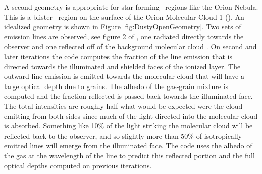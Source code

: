 A second geometry is appropriate for star-forming \hii\ regions like the Orion Nebula.
This is a blister \hii\ region on the surface of the Orion Molecular Cloud 1 
(\citealt{1973ApJ...183..863Z, 1974PASP...86..616B, BFM, Ferland2001a}).
An idealized geometry is shown in Figure \ref{fig:DustyOpenGeometry}.
Two sets of emission lines are observed, see figure 2 of \citet{1988ApJS...67...93C}, 
one radiated directly towards the observer and one reflected off of the background molecular cloud
\citep{1992ApJ...399L..67O}.
On second and later iterations the code computes the fraction
of the line emission that is directed towards the illuminated and shielded
faces of the ionized layer.  
The outward line emission is emitted towards the molecular cloud that will have
a large optical depth due to grains.  The albedo of the gas-grain mixture
is computed and the fraction reflected is passed back towards the illuminated
face.  The total intensities are roughly half what would be expected were
the cloud emitting from both sides since much of the light directed into
the molecular cloud is absorbed.  
Something like 10\% of the light
striking the molecular cloud will be reflected back to the observer, and
so slightly more than 50\% of isotropically emitted lines will emerge from
the illuminated face.  The code uses the albedo of the gas at the wavelength
of the line to predict this reflected portion and the full optical depths
computed on previous iterations.

